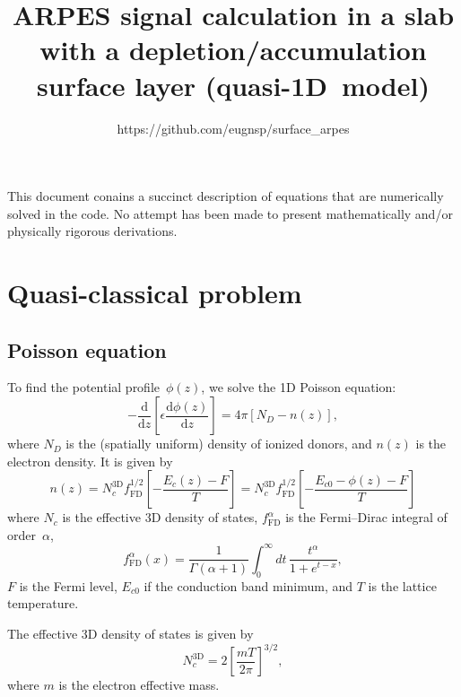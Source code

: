 \documentclass[10pt]{article}
\newcommand{\dd}{\mathrm{d}}
\newcommand{\fFD}{f_{\mathrm{FD}}}
\begin{document}
\title{ARPES signal calculation in a slab with a depletion/accumulation
surface layer (quasi-1D~model)}
\author{https://github.com/eugnsp/surface\_arpes}
\maketitle

This document conains a succinct description of equations that are numerically solved
in the code. No attempt has been made to present mathematically and/or physically
rigorous derivations.

\section{Quasi-classical problem}

\subsection{Poisson equation}

To find the potential profile~$\phi(z)$, we solve the 1D Poisson equation:
\begin{equation}
	\label{eq:poisson}
	- \frac{\dd}{\dd z} \left[ \epsilon \frac{\dd\phi(z)}{\dd z} \right]
	= 4\pi [N_D - n(z)],
\end{equation}
where $N_D$ is the (spatially uniform) density of ionized donors, and $n(z)$ is the
electron density. It is given by
\begin{equation}
	\label{eq:c_density}
	n(z) = N_c^\mathrm{3D} \fFD^{1/2} \left[ -\frac{E_c(z) - F}{T} \right]
	     = N_c^\mathrm{3D} \fFD^{1/2} \left[ -\frac{E_{c0} - \phi(z) - F}{T} \right]
\end{equation}
where $N_c$ is the effective 3D density of states, $\fFD^{\alpha}$ is the Fermi--Dirac
integral of order~$\alpha$,
\begin{equation}
	\fFD^{\alpha}(x) =
	\frac{1}{\Gamma(\alpha + 1)} \int_0^\infty dt\, \frac{t^\alpha}{1 + e^{t - x}},
\end{equation}
$F$ is the Fermi level, $E_{c0}$ if the conduction band minimum,
and $T$ is the lattice temperature.

The effective 3D density of states is given by
\begin{equation}
	N_c^\mathrm{3D} = 2 \left[ \frac{m T}{2\pi} \right]^{3/2},
\end{equation}
where $m$ is the electron effective mass.
\end{document}
